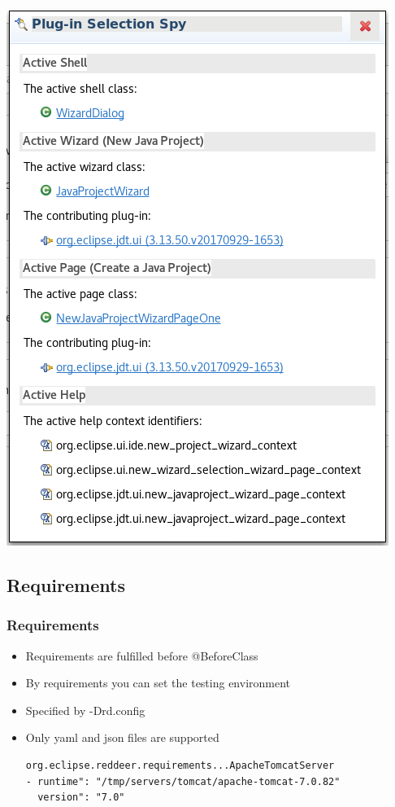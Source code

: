 \documentclass{beamer}
\begin{document}
\begin{frame}[fragile]
\begin{center}
\includegraphics[width=\textwidth,height=0.8\textheight,keepaspectratio]{plugin_spy.png}
\end{center}
\end{frame}

\subsection{Requirements}
\begin{frame}[fragile]
\frametitle{Requirements}
\begin{itemize}
\item Requirements are fulfilled before @BeforeClass
\item By requirements you can set the testing environment
\item Specified by -Drd.config
\item Only yaml and json files are supported
\vspace{0.5cm}
\begin{verbatim}
org.eclipse.reddeer.requirements...ApacheTomcatServer
- runtime": "/tmp/servers/tomcat/apache-tomcat-7.0.82"
  version": "7.0"
\end{verbatim}
\end{itemize}
\end{frame}
\end{document}
